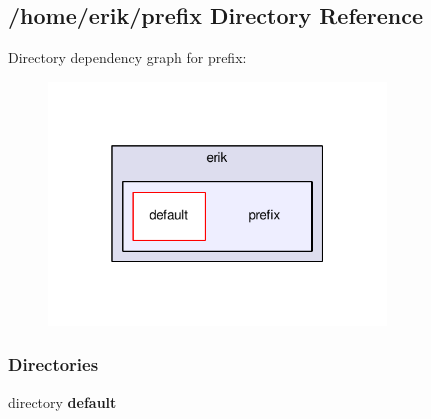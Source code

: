\subsection{/home/erik/prefix Directory Reference}
\label{dir_8bf104421d777a119379982ba15bc917}
Directory dependency graph for prefix\+:
\nopagebreak
\begin{figure}[H]
\begin{center}
\leavevmode
\includegraphics[width=254pt]{dir_8bf104421d777a119379982ba15bc917_dep}
\end{center}
\end{figure}
\subsubsection*{Directories}
\begin{DoxyCompactItemize}
\item 
directory {\bf default}
\end{DoxyCompactItemize}
